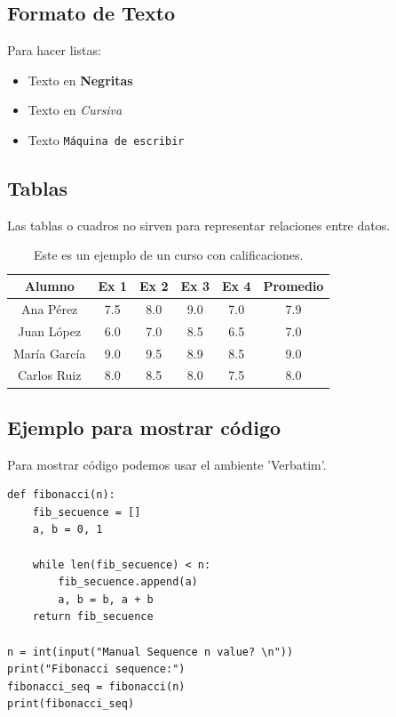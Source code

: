 \documentclass[12pt,letter]{article}
\begin{document}
\subsection{Formato de Texto}
Para hacer listas:
\begin{itemize}
  \item Texto en \textbf{Negritas}
  \item Texto en {\em Cursiva}
  \item Texto \texttt{Máquina de escribir}
\end{itemize}        

\subsection{Tablas}
Las tablas o cuadros no sirven para representar relaciones entre datos.




\begin{table}
  \label{tab:ejemplo1}
  \caption{Este es un ejemplo de un curso con calificaciones.}
  \centering
\begin{tabular}{|c c c c c c|}
  \hline
  \textbf{Alumno} & Ex 1 & Ex 2 & Ex 3 & Ex 4 &                                                                                 \textbf{Promedio} \\
  \hline
Ana Pérez & 7.5 & 8.0 & 9.0 & 7.0 & 7.9 
\\
Juan López & 6.0 & 7.0 & 8.5 & 6.5 & 7.0 
\\
María García & 9.0 & 9.5 & 8.9 & 8.5 & 9.0 
\\
Carlos Ruiz & 8.0 & 8.5 & 8.0 & 7.5 & 8.0
\\
\hline
\end{tabular}
\end{table}  

\subsection{Ejemplo para mostrar código}

Para mostrar código podemos usar el ambiente 'Verbatim'.

\begin{verbatim}
def fibonacci(n):
    fib_secuence = []
    a, b = 0, 1
    
    while len(fib_secuence) < n:
        fib_secuence.append(a)
        a, b = b, a + b
    return fib_secuence

n = int(input("Manual Sequence n value? \n"))
print("Fibonacci sequence:")
fibonacci_seq = fibonacci(n)
print(fibonacci_seq)
\end{verbatim} 
\end{document}
